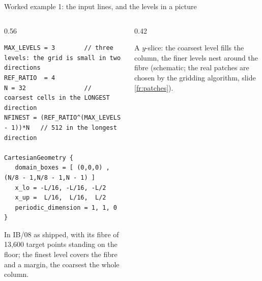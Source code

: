 \documentclass[aspectratio=169,11pt]{beamer}
\begin{document}
\begin{frame}[fragile]{Worked example 1: the input lines, and the levels in a picture}
\label{fr:ex1b}
\begin{columns}[T,onlytextwidth]
\begin{column}{0.56\textwidth}
\begin{lstlisting}[style=inputtiny]
MAX_LEVELS = 3        // three levels: the grid is small in two directions
REF_RATIO  = 4
N = 32                // coarsest cells in the LONGEST direction
NFINEST = (REF_RATIO^(MAX_LEVELS - 1))*N   // 512 in the longest direction

CartesianGeometry {
   domain_boxes = [ (0,0,0) , (N/8 - 1,N/8 - 1,N - 1) ]
   x_lo = -L/16, -L/16, -L/2
   x_up =  L/16,  L/16,  L/2
   periodic_dimension = 1, 1, 0
}
\end{lstlisting}
\footnotesize In IB/08 as shipped, with its fibre of 13,600 target points standing on the floor; the finest level covers the fibre and a margin, the coarsest the whole column.
\end{column}
\begin{column}{0.42\textwidth}
\centering
{}
\vspace{1mm}

\scriptsize A $y$-slice: the coarsest level fills the column, the finer levels nest around the fibre (schematic; the real patches are chosen by the gridding algorithm, slide \ref{fr:patches}).
\end{column}
\end{columns}
\end{frame}
\end{document}
